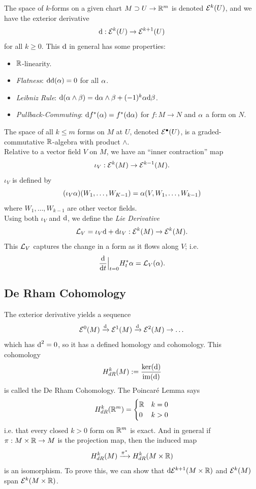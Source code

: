 \documentclass{amsart}
\begin{document}
The space of $k$-forms on a given chart $M\supset U\to \mathbb{R}^m$ is denoted $\mathcal{E}^k(U)$, and we have the exterior derivative
$$
\textrm{d} : \mathcal{E}^k(U)\to \mathcal{E}^{k+1}(U)
$$
for all $k\geq 0$. This $\textrm{d}$ in general has some properties:
\begin{itemize}
	\item $\mathbb{R}$-linearity.
	\item \textit{Flatness}: $\textrm{d}\textrm{d}(\alpha)=0$ for all $\alpha$.
	\item \textit{Leibniz Rule}: $\textrm{d}(\alpha\wedge \beta) = \textrm{d}\alpha \wedge \beta + (-1)^k \alpha \textrm{d} \beta$.
	\item \textit{Pullback-Commuting}: $\textrm{d} f^*(\alpha) = f^*(\textrm{d} \alpha)$ for $f:M\to N$ and $\alpha$ a form on $N$. 
\end{itemize}

The space of all $k\leq m$ forms on $M$ at $U$, denoted $\mathcal{E}^{\bullet}(U)$, is a graded-commutative $\mathbb{R}$-algebra with product $\wedge$.\\

Relative to a vector field $V$ on $M$, we have an ``inner contraction'' map
$$\iota_V:\mathcal{E}^{k}(M)\to \mathcal{E}^{k - 1}(M).$$
$\iota_V$ is defined by
$$
(\iota_V \alpha )(W_1,\dots,W_{K-1}) = \alpha(V,W_1,\dots,W_{k-1})
$$ 
where $W_1,\dots,W_{k-1}$ are other vector fields.\\

Using both $\iota_V$ and $\textrm{d}$, we define the \textit{Lie Derivative} $$\mathcal{L}_V = \iota_V\textrm{d} + \textrm{d} \iota_V : \mathcal{E}^k(M)\to \mathcal{E}^k(M).$$
This $\mathcal{L}_V$ captures the change in a form as it flows along $V$; i.e.
$$
\frac{\textrm{d}}{\textrm{d} t}\Big|_{t=0} H_t^*\alpha = \mathcal{L}_V(\alpha).
$$

\subsection{De Rham Cohomology} The exterior derivative yields a sequence
$$
\mathcal{E}^0(M) \xrightarrow{\textrm{d}} \mathcal{E}^{1}(M)\xrightarrow{\textrm{d}} \mathcal{E}^{2}(M)\to \dots
$$
which has $\textrm{d}^2=0$, so it has a defined homology and cohomology. This cohomology $$H^k_{dR}(M) := \frac{\ker(\textrm{d})}{\operatorname{im}(\textrm{d})}$$
is called the De Rham Cohomology. The Poincar\'e Lemma says
$$
H^k_{dR}(\mathbb{R}^m) = \begin{cases}
	\mathbb{R}& k=0\\
	0 & k>0
\end{cases}
$$
i.e. that every closed $k>0$ form on $\mathbb{R}^m$ is exact. And in general if $\pi:M\times \mathbb{R}\to M$ is the projection map, then the induced map $$H^k_{dR}(M) \xrightarrow{\pi^*} H^{k}_{dR}(M\times \mathbb{R})$$
is an isomorphism. To prove this, we can show that $\textrm{d}\mathcal{E}^{k+1}(M\times \mathbb{R})$ and $\mathcal{E}^k(M)$ span $\mathcal{E}^k(M\times \mathbb{R})$.\\
\end{document}
